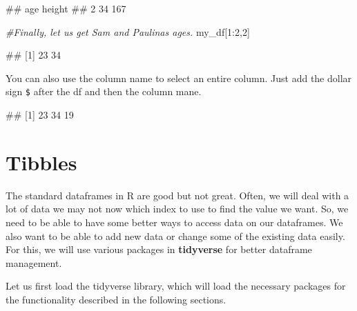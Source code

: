 \documentclass[
]{book}
\newenvironment{Shaded}{\begin{snugshade}}{\end{snugshade}}
\newcommand{\CommentTok}[1]{\textcolor[rgb]{0.56,0.35,0.01}{\textit{#1}}}
\newcommand{\DecValTok}[1]{\textcolor[rgb]{0.00,0.00,0.81}{#1}}
\newcommand{\NormalTok}[1]{#1}
\newcommand{\SpecialCharTok}[1]{\textcolor[rgb]{0.00,0.00,0.00}{#1}}
\begin{document}
\begin{Shaded}
\begin{Highlighting}[]
\NormalTok{\#\#   age height}
\NormalTok{\#\# 2  34    167}
\end{Highlighting}
\end{Shaded}

\begin{Shaded}
\begin{Highlighting}[]
\CommentTok{\#Finally, let us get Sam and Paulina\textquotesingle{}s ages.}
\NormalTok{my\_df[}\DecValTok{1}\SpecialCharTok{:}\DecValTok{2}\NormalTok{,}\DecValTok{2}\NormalTok{]}
\end{Highlighting}
\end{Shaded}

\begin{Shaded}
\begin{Highlighting}[]
\NormalTok{\#\# [1] 23 34}
\end{Highlighting}
\end{Shaded}

You can also use the column name to select an entire column. Just add the dollar sign \texttt{\$} after the df and then the column mane.

\begin{Shaded}
\end{Shaded}

\begin{Shaded}
\begin{Highlighting}[]
\NormalTok{\#\# [1] 23 34 19}
\end{Highlighting}
\end{Shaded}

\hypertarget{tibbles}{%
\section{Tibbles}\label{tibbles}}

The standard dataframes in R are good but not great. Often, we will deal with a lot of data we may not now which index to use to find the value we want. So, we need to be able to have some better ways to access data on our dataframes. We also want to be able to add new data or change some of the existing data easily. For this, we will use various packages in \textbf{tidyverse} for better dataframe management.

Let us first load the tidyverse library, which will load the necessary packages for the functionality described in the following sections.
\end{document}
